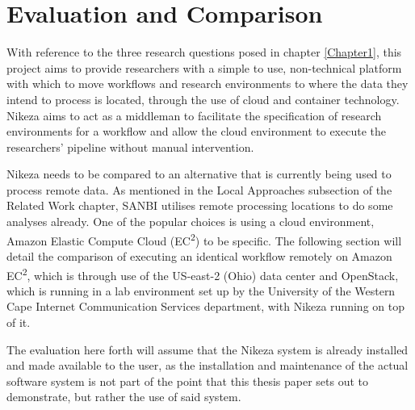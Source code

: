 
\chapter{Evaluation and Comparison} %

\label{Chapter4} %




With reference to the three research questions posed in chapter \ref{Chapter1}, this project aims to provide researchers with a simple to use, non-technical platform with which to move workflows and research environments to where the data they intend to process is located, through the use of cloud and container technology. Nikeza aims to act as a middleman to facilitate the specification of research environments for a workflow and allow the cloud environment to execute the researchers' pipeline without manual intervention. 

Nikeza needs to be compared to an alternative that is currently being used to process remote data. As mentioned in the Local Approaches subsection of the Related Work chapter, SANBI utilises remote processing locations to do some analyses already. One of the popular choices is using a cloud environment, Amazon Elastic Compute Cloud (EC\textsuperscript{2}) to be specific. The following section will detail the comparison of executing an identical workflow remotely on Amazon EC\textsuperscript{2}, which is through use of the US-east-2 (Ohio) data center and OpenStack, which is running in a lab environment set up by the University of the Western Cape Internet Communication Services department, with Nikeza running on top of it.

The evaluation here forth will assume that the Nikeza system is already installed and made available to the user, as the installation and maintenance of the actual software system is not part of the point that this thesis paper sets out to demonstrate, but rather the use of said system.

